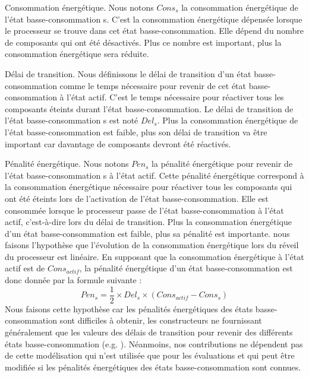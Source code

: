 Consommation énergétique. Nous notons $Cons_s$ la consommation énergétique de l’état basse-consommation s. C’est la consommation énergétique dépensée lorsque le processeur 
se trouve dans cet état basse-consommation. 
Elle dépend du nombre de composants qui ont été désactivés. 
Plus ce nombre est important, plus la consommation énergétique sera réduite.

Délai de transition. Nous définissons le délai de transition d’un état basse-consommation comme le temps nécessaire pour revenir de cet état basse-consommation à l’état actif.
 C’est le temps nécessaire pour réactiver tous les composants éteints durant l’état basse-consommation. 
 Le délai de transition de l’état basse-consommation s est noté $Del_s$. 
 Plus la consommation énergétique de l’état basse-consommation est faible, 
 plus son délai de transition va être important car davantage de composants devront été réactivés.

Pénalité énergétique. Nous notons $Pen_s$ la pénalité énergétique pour revenir de l’état basse-consommation s à l’état actif.
Cette pénalité énergétique correspond à la consommation énergétique nécessaire pour réactiver tous les composants qui ont été 
éteints lors de l’activation de l’état basse-consommation. Elle est consommée lorsque le processeur passe de l’état basse-consommation à l’état actif, 
c’est-à-dire lors du délai de transition. Plus la consommation énergétique d’un état basse-consommation est faible, plus sa pénalité est importante.
nous faisons l’hypothèse que l’évolution de la consommation énergétique lors du réveil du processeur est linéaire. En supposant que la consommation énergétique à l’état actif est de $Cons_{actif}$,
la pénalité énergétique d’un état basse-consommation est donc donnée par la formule suivante :
\begin{equation}
Pen_s = \frac{1}{2} \times Del_s \times (Cons_{actif} - Cons_s)
\end{equation}
Nous faisons cette hypothèse car les pénalités énergétiques des états basse-consommation sont diﬃciles à obtenir, 
les constructeurs ne fournissant généralement que les valeurs des délais de transition pour revenir des diﬀérents états basse-consommation 
(e.g. \cite{STM, MPC}). Néanmoins, nos contributions ne dépendent pas de cette modélisation qui n’est utilisée que pour les évaluations et qui 
peut être modifiée si les pénalités énergétiques des états basse-consommation sont connues.

